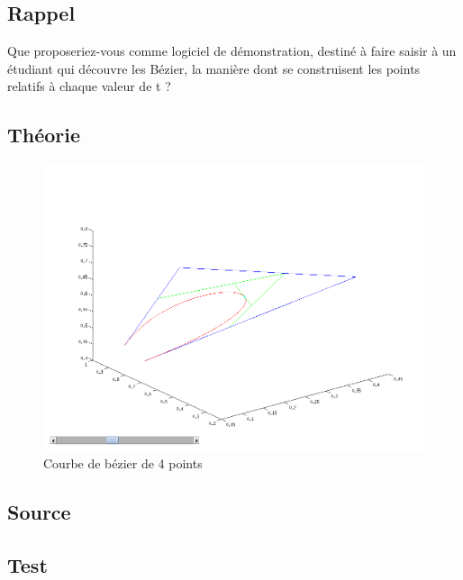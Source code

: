 \documentclass[a4paper,10pt]{report}
\begin{document}
\subsection*{Rappel}

Que proposeriez-vous comme logiciel de démonstration, destiné à faire saisir à un étudiant qui découvre les Bézier, la manière dont se construisent les points relatifs à chaque valeur de t ?
\subsection*{Théorie}

\begin{figure}[h]
	\begin{center}
		\includegraphics[scale=0.6]{guiCastle}
		\caption{Courbe de bézier de 4 points}
	\end{center}
\end{figure}


\subsection*{Source}

\begin{center}
	
\end{center}

\subsection*{Test}
\end{document}
